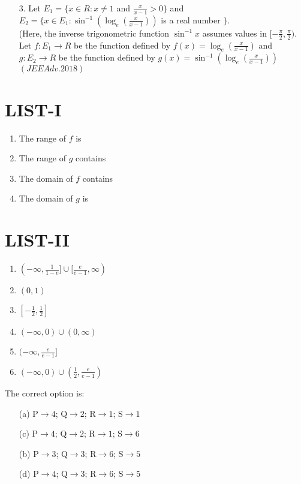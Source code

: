 \documentclass[journal,12pt,twocolumn]{IEEEtran}
\theoremstyle{remark}
\begin{document}
                 \begin{enumerate}
	\item[3.] Let $E_1=\{x\in R:x\neq1$ and $\frac{x}{x-1}>0\}$ and $E_2=\{x\in E_1:\sin^{-1}(\log_e(\frac{x}{x-1}))$ is a real number $\}$. \\ 

		(Here, the inverse trigonometric function $\sin^{-1}x$ assumes values in $[-\frac{\pi}{2},\frac{\pi}{2})$. \\

		Let $f:E_1\to R$ be the function defined by $f(x)=\log_e(\frac{x}{x-1})$ and $g:E_2\to R$ be the function defined by $g(x)=\sin^{-1}(\log_e(\frac{x}{x-1}))$
		  \hfill${(JEE Adv.2018)}$
                 \end{enumerate}
\begin{multicols}{2}
	\section{LIST-I}
	\begin{enumerate}[label=\Alph*, start=16]
	\item The range of $f$ is
	\item The range of $g$ contains
	\item The domain of $f$ contains
	\item The domain of $g$ is 
\end{enumerate}
\columnbreak
	\section{LIST-II}
\begin{enumerate}
	\item $(-\infty,\frac{1}{1-e}]\cup[\frac{e}{e-1},\infty)$
	\item $(0,1)$
	\item $[-\frac{1}{2},\frac{1}{2}]$
	\item $(-\infty,0)\cup(0,\infty)$
	\item $(-\infty,\frac{e}{e-1}]$
	\item $(-\infty,0)\cup(\frac{1}{2},\frac{e}{e-1})$
\end{enumerate}
\end{multicols}
The correct option is:
\begin{multicols}{2}
	\begin{enumerate}
		\item[(a)] P$\to4$; Q$\to2$; R$\to1$; S$\to1$
		\item[(c)] P$\to4$; Q$\to2$; R$\to1$; S$\to6$
	\end{enumerate}
	\columnbreak
	\begin{enumerate}
		\item[(b)] P$\to3$; Q$\to3$; R$\to6$; S$\to5$
		\item[(d)] P$\to4$; Q$\to3$; R$\to6$; S$\to5$
	\end{enumerate}
\end{multicols}
\end{document}
